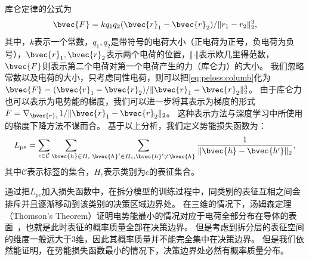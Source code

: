 库仑定律的公式为
\begin{equation}
\label{eq:peloss:columb}
    \bvec{F} =  k {q_1q_2(\bvec{r}_1 - \bvec{r}_2)}/{\Vert r_1 - r_2 \Vert_2^3},
\end{equation}
其中，$k$表示一个常数，$q_1, q_2$是带符号的电荷大小（正电荷为正号，负电荷为负号），$\bvec{r}_1, \bvec{r}_2$表示两个电荷的位置，$\Vert \cdot \Vert$表示欧几里得范数，$\bvec{F}$则表示第二个电荷对第一个电荷产生的力（库仑力）的大小。
%
我们忽略常数以及电荷的大小，只考虑同性电荷，则可以把\autoref{eq:peloss:columb}化为$\bvec{F} = (\bvec{r}_1 - \bvec{r}_2) / \Vert\bvec{r}_1 - \bvec{r}_2 \Vert_2^3$。
%
由于库仑力也可以表示为电势能的梯度，我们可以进一步将其表示为梯度的形式$F = \nabla_{\bvec{r}_1} 1/\Vert \bvec{r}_1 - \bvec{r}_2 \Vert_2$。
%
这种表示方法与深度学习中所使用的梯度下降方法不谋而合。
%
基于以上分析，我们定义势能损失函数为：
\begin{equation}
    L_\text{pe} = \sum\limits_{c\in\mathcal C}\sum\limits_{\bvec{h} \in H_c}\sum\limits_{\bvec{h}' \in H_c, \bvec{h}' \ne \bvec{h}} \dfrac{1}{\Vert \bvec{h} - \bvec{h'} \Vert_2},
\end{equation}
其中$\mathcal C$表示标签的集合，$H_c$表示类别为$c$的表征集合。


通过把$L_{pe}$加入损失函数中，在拆分模型的训练过程中，同类别的表征互相之间会排斥并且逐渐移动到该类别的决策区域边界处。
%
在三维的情况下，汤姆森定理（Thomson's Theorem）证明电势能最小的情况对应于电荷全部分布在导体的表面~\cite{thomson_1913_atom,bakhoum_2008_thomson_proof}，也就是此时表征的概率质量全部在决策边界。
%
但是考虑到拆分层的表征空间的维度一般远大于3维，因此其概率质量并不能完全集中在决策边界。
但是我们依然能证明，在势能损失函数最小的情况下，决策边界处必然有概率质量分布。

